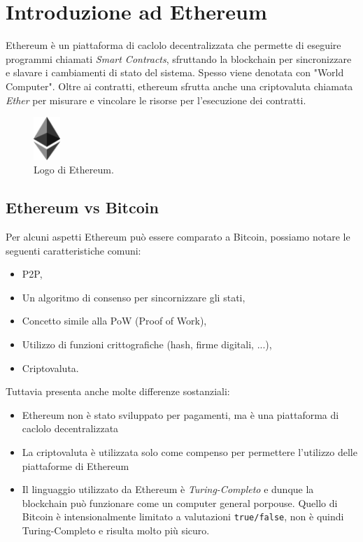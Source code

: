 \chapter{Introduzione ad Ethereum}
Ethereum è un piattaforma di caclolo decentralizzata che permette di eseguire programmi
chiamati \textit{Smart Contracts},
sfruttando la blockchain per sincronizzare e slavare i cambiamenti di stato del sistema.
Spesso viene denotata con "World Computer".
Oltre ai contratti, ethereum sfrutta anche una criptovaluta chiamata \textit{Ether} per
misurare e vincolare le risorse per l'esecuzione dei contratti.


\begin{figure}[H]
    \centering
    \includegraphics[width=1cm, keepaspectratio]{capitoli/ethereum/imgs/ethereum.png}
    \caption{Logo di Ethereum.}
\end{figure}

\section{Ethereum vs Bitcoin}
Per alcuni aspetti Ethereum può essere comparato a Bitcoin,
possiamo notare le seguenti caratteristiche comuni:

\begin{itemize}
    \item P2P,
    \item Un algoritmo di consenso per sincornizzare gli stati,
    \item Concetto simile alla PoW (Proof of Work),
    \item Utilizzo di funzioni crittografiche (hash, firme digitali, ...),
    \item Criptovaluta.
\end{itemize}

Tuttavia presenta anche molte differenze sostanziali:

\begin{itemize}
    \item Ethereum non è stato sviluppato per pagamenti, ma è una piattaforma di caclolo
          decentralizzata
    \item La criptovaluta è utilizzata solo come compenso per permettere
          l'utilizzo delle piattaforme di Ethereum
    \item Il linguaggio utilizzato da Ethereum è \textit{Turing-Completo} e dunque
          la blockchain può funzionare come un computer general porpouse.
          Quello di Bitcoin è intensionalmente limitato a valutazioni \verb|true/false|,
          non è quindi Turing-Completo e risulta molto più sicuro.
\end{itemize}

